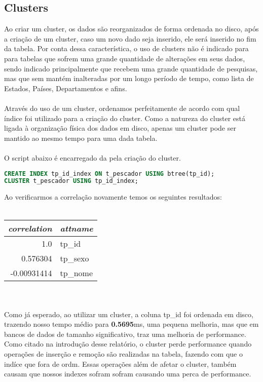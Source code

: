 \documentclass[12pt, a4paper, twoside, titlepage]{article}
\begin{document}
\subsection{Clusters}
Ao criar um cluster, os dados são reorganizados de forma ordenada no disco, após a criação de um cluster, caso um novo dado seja inserido, ele será inserido no fim da tabela. Por conta dessa característica, o uso de clusters não é indicado para para tabelas que sofrem uma grande quantidade de alterações em seus dados, sendo indicado principalmente que recebem uma grande quantidade de pesquisas, mas que sem mantém inalteradas por um longo período de tempo, como lista de Estados, Países, Departamentos e afins.
\\\\Através do uso de um cluster, ordenamos perfeitamente de acordo com qual índice foi utilizado para a criação do cluster. Como a natureza do cluster está ligada à organização física dos dados em disco, apenas um cluster pode ser mantido ao mesmo tempo para uma dada tabela.
\\\\O script abaixo é encarregado da pela criação do cluster.
\begin{lstlisting}[language=SQL]
CREATE INDEX tp_id_index ON t_pescador USING btree(tp_id);
CLUSTER t_pescador USING tp_id_index;
\end{lstlisting}
Ao verificarmos a correlação novamente temos os seguintes resultados:
\\\\
\begin{tabular}{r | l}
	\textit{correlation} & \textit{attname} \\
	\hline
	1.0 & tp\_id \\
	0.576304 & tp\_sexo \\
	-0.00931414 & tp\_nome \\
\end{tabular}
\\\\Como já esperado, ao utilizar um cluster, a coluna tp\_id foi ordenada em disco, trazendo nosso tempo médio para \textbf{0.5695}ms, uma pequena melhoria, mas que em bancos de dados de tamanho significativo, traz uma melhoria de performance. 
\\Como citado na introdução desse relatório, o cluster perde performance quando operações de inserção e remoção são realizadas na tabela, fazendo com que o indíce que fora de ordm. Essas operações além de afetar o cluster, também causam que nossos indexes sofram sofram causando uma perca de performance. 
\end{document}
